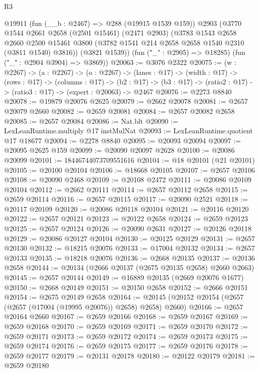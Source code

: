 \begin{lexlean}{R3}
\begin{coremodule}
      @19911
      (fun (__b : @2467) => @288 (@19915 @1539 @159))
      @2903
      (@3770
        @1544
        @2661
        @2658
        (@2501 @15461)
        (@2471 @2903)
        (@3783
          @1543
          @2658
          @2660
          @2500
          @15461
          @3800
          (@3782 @1541 @214 @2658 @2658 @1540 @2310 (@3811 @1540) @3816))
        (@3821 @1539))
      (fun ("_" : @2905) => @18285)
      (fun ("_" : @2904 @3904) => @3869))
@20063 := @3076 @2322
@20075 := (w : @2267) ->
  (a : @2267) ->
  (o : @2267) ->
  (lanes : @17) ->
  (width : @17) ->
  (rows : @17) ->
  (columns : @17) ->
  (b2 : @17) -> (b3 : @17) -> (ratio2 : @17) -> (ratio3 : @17) -> (expert : @20063) -> @2467
@20076 := @2273 @8840
@20078 := @19879 @20076 @2625
@20079 := @2662 @20078
@20081 := @2657 @20079 @2660
@20082 := @2659 @20081
@20084 := @2657 @20082 @2658
@20085 := @2657 @20084
@20086 := Nat.blt
@20090 := LexLeanRuntime.multiply @17 instMulNat
@20093 := LexLeanRuntime.quotient @17 @18677
@20094 := @2278 @8840
@20095 := @20093 @20094
@20097 := @20095 @2625 @159
@20099 := @20090 @20097 @2628
@20100 := @20086 @20099
@20101 := 18446744073709551616
@20104 := @18 @20101 (@21 @20101)
@20105 := @20100 @20104
@20106 := @18668 @20105
@20107 := @2657 @20106
@20108 := @20090 @2468
@20109 := @20108 @2472
@20111 := @20086 @20109 @20104
@20112 := @2662 @20111
@20114 := @2657 @20112 @2658
@20115 := @2659 @20114
@20116 := @2657 @20115
@20117 := @20090 @2521
@20118 := @20117 @20109
@20120 := @20086 @20118 @20104
@20121 := @20116 @20120
@20122 := @2657 @20121
@20123 := @20122 @2658
@20124 := @2659 @20123
@20125 := @2657 @20124
@20126 := @20090 @2631
@20127 := @20126 @20118
@20129 := @20086 @20127 @20104
@20130 := @20125 @20129
@20131 := @2657 @20130
@20132 := @18215 @20076
@20133 := @17004 @20132
@20134 := @2657 @20133
@20135 := @18218 @20076
@20136 := @2668 @20135
@20137 := @20136 @2658
@20144 := @20134 (@2666 @20137 (@2675 @20135 @2658) @2660 @2663)
@20145 := @2657 @20144
@20149 := @16889 @20135 (@2669 @20076 @1677)
@20150 := @2668 @20149
@20151 := @20150 @2658
@20152 := @2666 @20151
@20154 := @2675 @20149 @2658
@20164 := @20145 (@20152 @20154 (@2657 (@2657 (@17004 (@19995 @20076)) @2658) @2658) @2660)
@20166 := @2657 @20164 @2660
@20167 := @2659 @20166
@20168 := @2659 @20167
@20169 := @2659 @20168
@20170 := @2659 @20169
@20171 := @2659 @20170
@20172 := @2659 @20171
@20173 := @2659 @20172
@20174 := @2659 @20173
@20175 := @2659 @20174
@20176 := @2659 @20175
@20177 := @2659 @20176
@20178 := @2659 @20177
@20179 := @20131 @20178
@20180 := @20122 @20179
@20181 := @2659 @20180

\end{coremodule}
\end{lexlean}
